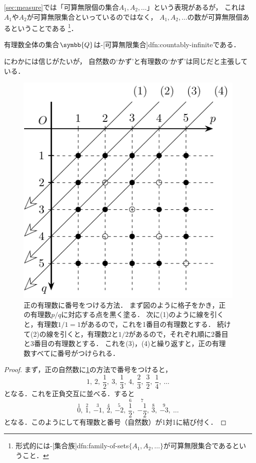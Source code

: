 \documentclass[../sotsu.tex]{subfiles}
\begin{document}
\cref{sec:measure}では「可算無限個の集合$A_1, A_2, \dotsc$」という表現があるが，
これは$A_1$や$A_2$が可算無限集合といっているのではなく，
$A_1, A_2, \dotsc$の数が可算無限個あるということである%
\footnote{
    形式的には-[集合族]{dfn:family-of-sets}$\{ A_1, A_2, \dotsc \}$が可算無限集合であるということ．
}．


\begin{proposition}
    \label{thm:rational-numbers-are-countable}
    有理数全体の集合$\symbb{Q}$は-[可算無限集合]{dfn:countably-infinite}である．
\end{proposition}

にわかには信じがたいが，
自然数の`かず'と有理数の`かず'は同じだと主張している．

\begin{figure}[tbp]
    \centering
    \includegraphics[width=0.5\linewidth]{rational_countable.pdf}
    \caption{
        正の有理数に番号をつける方法．
        まず図のように格子をかき，正の有理数$p/q$に対応する点を黒く塗る．
        次に(1)のように線を引くと，有理数$1/1 = 1$があるので，これを1番目の有理数とする．
        続けて(2)の線を引くと，有理数$2$と$1/2$があるので，それぞれ順に2番目と3番目の有理数とする．
        これを(3)，(4)と繰り返すと，正の有理数すべてに番号がつけられる．
    }
    \label{fig:positive-rational-count}
\end{figure}


\begin{proof}
    まず，正の自然数に\cref{fig:positive-rational-count}の方法で番号をつけると，
    \[  1, \ 
        2, \ \frac{1}{2}, \ 
        3, \ \frac{1}{3}, \ 
        4, \ \frac{2}{3}, \ \frac{3}{2}, \ \frac{1}{4}, \ 
        \dotsc  \]
    となる．これを正負交互に並べる．すると
    \[  \overset{1}{0}, \ 
        \overset{2}{1}, \ \overset{3}{-1}, \ 
        \overset{4}{2}, \ \overset{5}{-2}, \ \overset{6}{\frac{1}{2}}, \ \overset{7}{-\frac{1}{2}}, \ 
        \overset{8}{3}, \ \overset{9}{-3}, \ \dotsc  \]
    となる．このようにして有理数と番号（自然数）が1対1に結び付く．
\end{proof}
\end{document}
